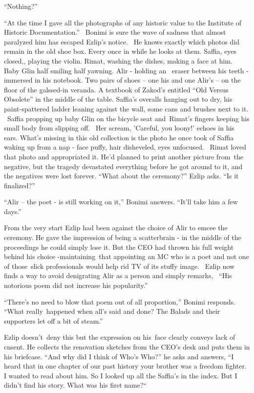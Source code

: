 \documentclass[twoside,11pt]{book}
\begin{document}
``Nothing?''

``At the time I gave all the photographs of any historic value to the Institute of Historic
Documentation.'' \ Bonimi is sure the wave of sadness that{ }almost paralyzed him has escaped Ezlip's
notice. \ He knows exactly which photos did remain in the old shoe box. Every once in while he looks at them. Saffia,
eyes closed,, playing the violin. Rimat, washing the dishes, making a face at him. Baby Glin half smiling half yawning.
Alir - holding an{ }\ eraser between his teeth - immersed in his notebook. Two pairs of shoes -- one his
and one Alir's -- on the floor of the galssed-in veranda. A textbook of Zakod's entitled ``Old Versus
Obsolete'' in the middle of the table. Saffia's overalls hanging out to dry, his paint-spattered ladder
leaning against the wall, some cans and brushes next to it. ~Saffia propping up baby Glin on the bicycle seat
and~Rimat's fingers keeping his small body from slipping off. ~Her scream, 'Careful, you loony!' echoes in his ears.
What's missing in this old collection is the photo he once took of Saffia waking up from a nap - face puffy, hair
disheveled,{ }{eyes
unfocused.} ~Rimat loved that photo and appropriated it. He'd planned to print another picture from~the negative, but
the tragedy devastated everything before he got around to it, and the negatives were lost forever. ``What
about the ceremony?'' Ezlip asks. ``Is it finalized?''

``Alir -- the poet - is still working on it,'' Bonimi answers. ``It'll take him a
few days.''

From the very start Ezlip had been against the choice of Alir to emcee the ceremony. He gave the impression of being a
scatterbrain - in the middle of the proceedings he could simply lose it. But the CEO had thrown his full weight behind
his choice -maintaining~that appointing an MC who is a poet and not one of those~slick professionals would help rid TV
of its stuffy image.{ }~Ezlip now finds a way to avoid denigrating Alir as a person and simply remarks,
\ ``His notorious poem did not increase his popularity.''

``There's no need to blow that poem out of all proportion,'' Bonimi responds.
``What really~happened when all's said and done? The Balads and their supporters let off a bit of
steam.''

Ezlip doesn't~deny this but the expression on his~face clearly conveys lack of cnsent. He collects the renovation
sketches from the CEO's desk and puts them in his briefcase. ``And why did I think of Who's
Who?'' he asks and answers, ``I heard that in one chapter of our past history your brother
was a freedom fighter. I wanted to read about him. So I looked up all the Saffia's in the index. But I didn't find his
story. What was his first name?``~
\end{document}
